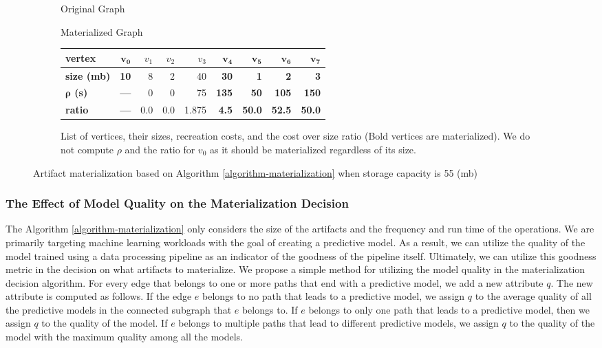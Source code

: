 \begin{figure}
\begin{subfigure}{0.5\linewidth}
\centering

\caption{Original Graph}
\label{fig-materialization-example}
\end{subfigure}%
\begin{subfigure}{0.5\linewidth}
\centering

\caption{Materialized Graph}
\label{fig-materialization-example}
\end{subfigure}
\begin{subfigure}{\linewidth}
\begin{tabular}{l||>{\bfseries}r|r|r|r|>{\bfseries}r|>{\bfseries}r|>{\bfseries}r|>{\bfseries}r}
\hline
\textbf{vertex} & $\boldsymbol{v_0}$ & $v_1$ & $v_2$ & $v_3$ & $\boldsymbol{v_4}$ & $\boldsymbol{v_5}$ & $\boldsymbol{v_6}$ & $\boldsymbol{v_7}$  \\
\hline
\textbf{size (mb)}    & 10 & 8 & 2 & 40 & 30 & 1 & 2 & 3            \\
\textbf{$\boldsymbol{\rho}$ (s)} & ---   & 0 & 0& 75 & 135 & 50 & 105 & 150	  \\
\textbf{ratio}& --- &0.0 & 0.0 & 1.875 & 4.5 & 50.0 & 52.5 & 50.0 \\
\hline
\end{tabular}
\caption{List of vertices, their sizes, recreation costs, and the cost over size ratio (Bold vertices are materialized). We do not compute $\rho$ and the ratio for $v_0$ as it should be materialized regardless of its size.}
\end{subfigure}
\caption{Artifact materialization based on Algorithm \ref{algorithm-materialization} when storage capacity is 55 (mb)}
\end{figure}

\subsubsection{The Effect of Model Quality on the Materialization Decision}
The Algorithm \ref{algorithm-materialization} only considers the size of the artifacts and the frequency and run time of the operations.
We are primarily targeting machine learning workloads with the goal of creating a predictive model.
As a result, we can utilize the quality of the model trained using a data processing pipeline as an indicator of the goodness of the pipeline itself.
Ultimately, we can utilize this goodness metric in the decision on what artifacts to materialize.
We propose a simple method for utilizing the model quality in the materialization decision algorithm.
For every edge that belongs to one or more paths that end with a predictive model, we add a new attribute $q$.
The new attribute is computed as follows.
If the edge $e$ belongs to no path that leads to a predictive model, we assign $q$ to the average quality of all the predictive models in the connected subgraph that $e$ belongs to.
If $e$ belongs to only one path that leads to a predictive model, then we assign $q$ to the quality of the model.
If $e$ belongs to multiple paths that lead to different predictive models, we assign $q$ to the quality of the model with the maximum quality among all the models.

